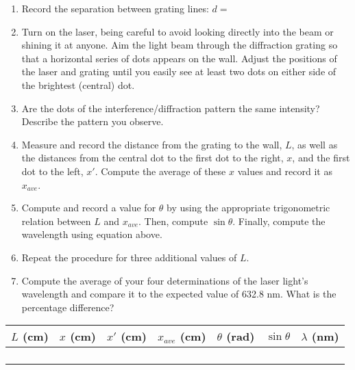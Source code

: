 \begin{enumerate}
\item Record the separation between grating lines: \( d= \)
\item Turn on the laser, being careful to avoid looking directly into the
beam or shining it at anyone. Aim the light beam through the diffraction
grating so that a horizontal series of dots appears on the wall. Adjust
the positions of the laser and grating until you easily see at least
two dots on either side of the brightest (central) dot.
\item Are the dots of the interference/diffraction pattern the same intensity?
Describe the pattern you observe.\vspace{15mm}

\item Measure and record the distance from the grating to the wall, $L$,
as well as the distances from the central dot to the first dot to
the right, $x$, and the first dot to the left, $x'$. Compute the average
of these $x$ values and record it as $x_{ave}$.
\item Compute and record a value for $\theta$ by using the appropriate trigonometric
relation between $L$ and $x_{ave}$. Then, compute $\sin \theta$. Finally,
compute the wavelength using equation above.
\item Repeat the procedure for three additional values of $L$.
\item Compute the average of your four determinations of the laser light's
wavelength and compare it to the expected value of 632.8 nm. What
is the percentage difference?\vspace{15mm}

\end{enumerate}
\vspace{0.3cm}
\begin{center}
\begin{tabular}{|c|c|c|c|c|c|c|}
\hline 
\( L \) (cm)&
\( x \) (cm)&
\( x' \) (cm)&
\( x_{ave} \) (cm)&
\( \theta  \) (rad)&
\( \sin \theta  \)&
\( \lambda  \) (nm)\\
\hline
\hline 
&
&
&
&
&
&
\\
\hline 
&
&
&
&
&
&
\\
\hline 
&
&
&
&
&
&
\\
\hline 
&
&
&
&
&
&
\\
\hline
\end{tabular}\vspace{0.3cm}

\end{center}
